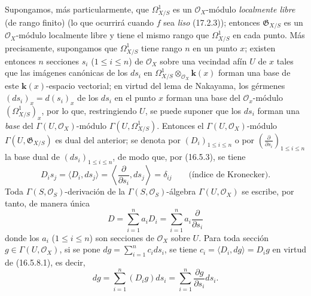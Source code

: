 \begin{env}[16.5.8]
\label{IV.16.5.8}
Supongamos, más particularmente, que $\varOmega_{X/S}^1$ es un
$\mathcal{O}_X$-módulo \emph{localmente libre} (de rango finito) (lo que ocurrirá
cuando $f$ sea \emph{liso} (17.2.3)); entonces $\mathfrak{G}_{X/S}$ es un
$\mathcal{O}_X$-módulo localmente libre y tiene el mismo rango que $\varOmega_{X/S}^1$
en cada punto. Más precisamente, supongamos que $\varOmega_{X/S}^1$ tiene
rango $n$ en un punto $x$; existen entonces $n$ secciones $s_i$ ($1\leq i\leq n$)
de $\mathcal{O}_X$ sobre una vecindad afín $U$ de $x$ tales que las
imágenes canónicas de los $ds_i$ en
$\varOmega_{X/S}^1\otimes_{\mathcal{O}_X}\boldsymbol k(x)$ forman una base de este
$\boldsymbol k(x)$-espacio vectorial; en virtud del lema de Nakayama, los gérmenes
$(ds_i)_x=d(s_i)_x$ de los $ds_i$ en el punto $x$ forman una base del
$\mathcal{O}_x$-módulo $(\varOmega_{X/S}^1)_x$, por lo que, restringiendo $U$, se
puede suponer que los $ds_i$ forman una \emph{base} del
$\Gamma(U,\mathcal{O}_X)$-módulo $\Gamma(U,\varOmega_{X/S}^1)$. Entonces el
$\Gamma(U,\mathcal{O}_X)$-módulo $\Gamma(U,\mathfrak{G}_{X/S})$ es dual del
anterior; se denota por $(D_i)_{1\leq i\leq n}$ o por
$\left(\frac{\partial}{\partial s_i}\right)_{1\leq i\leq n}$ la base dual de
$(ds_i)_{1\leq i\leq n}$, de modo que, por (16.5.3), se tiene
\[
  D_is_j=\langle D_i,ds_j\rangle
  =\left\langle\frac{\partial}{\partial s_i},ds_j\right\rangle
  =\delta_{ij}\qquad\text{(índice de Kronecker).}
  \tag{16.5.8.1}
  \label{IV.16.5.8.1}
\]
Toda $\Gamma(S,\mathcal{O}_S)$-derivación de la
$\Gamma(S,\mathcal{O}_S)$-álgebra $\Gamma(U,\mathcal{O}_X)$ se escribe, por tanto,
de manera única
\[
  D=\sum_{i=1}^n a_iD_i=\sum_{i=1}^n a_i\frac{\partial}{\partial s_i}
\]
donde los $a_i$ ($1\leq i\leq n$) son secciones de $\mathcal{O}_X$ sobre
$U$. Para toda sección $g\in\Gamma(U,\mathcal{O}_X)$, si se pone
$dg=\sum_{i=1}^n c_i ds_i$, se tiene
$c_i=\langle D_i,dg\rangle=D_ig$ en virtud de (16.5.8.1), es decir,
\[
  dg=\sum_{i=1}^n(D_ig)ds_i
  =\sum_{i=1}^n\frac{\partial g}{\partial s_i}ds_i.
  \tag{16.5.8.2}
  \label{IV.16.5.8.2}
\]
\end{env}

